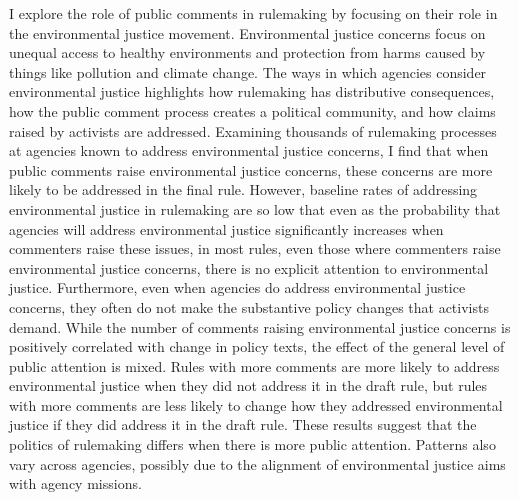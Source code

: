 I explore the role of public comments in rulemaking by focusing on their role in the environmental justice movement. Environmental justice concerns focus on unequal access to healthy environments and protection from harms caused by things like pollution and climate change. The ways in which agencies consider environmental justice highlights how rulemaking has distributive consequences, how the public comment process creates a political community, and how claims raised by activists are addressed. Examining thousands of rulemaking processes at agencies known to address environmental justice concerns, I find that when public comments raise environmental justice concerns, these concerns are more likely to be addressed in the final rule. However, baseline rates of addressing environmental justice in rulemaking are so low that even as the probability that agencies will address environmental justice significantly increases when commenters raise these issues, in most rules, even those where commenters raise environmental justice concerns, there is no explicit attention to environmental justice. Furthermore, even when agencies do address environmental justice concerns, they often do not make the substantive policy changes that activists demand. While the number of comments raising environmental justice concerns is positively correlated with change in policy texts, the effect of the general level of public attention is mixed. Rules with more comments are more likely to address environmental justice when they did not address it in the draft rule, but rules with more comments are less likely to change how they addressed environmental justice if they did address it in the draft rule. These results suggest that the politics of rulemaking differs when there is more public attention. Patterns also vary across agencies, possibly due to the alignment of environmental justice aims with agency missions. 
